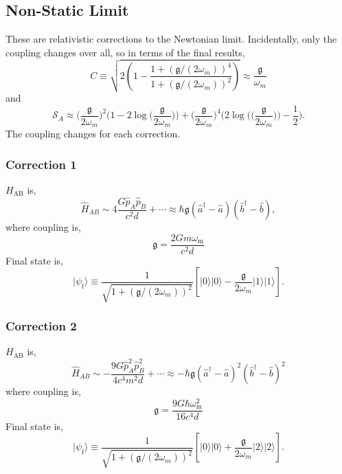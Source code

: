\documentclass[11pt]{article}
\begin{document}
\subsection{Non-Static Limit}
These are relativistic corrections to the Newtonian limit. Incidentally, only the coupling changes over all, so in terms of the final results,
\begin{equation}
C\equiv\sqrt{2(1-\frac{1+(\mathfrak{g}/(2\omega_{m}))^{4}}{1+(\mathfrak{g}/(2\omega_{m}))^{2}})}\approx\frac{\mathfrak{g}}{\omega_{m}}
\end{equation}
and
\begin{equation}
    \mathcal{S}_A \approx \Big(\frac{\mathfrak{g}}{2\omega_{m}}\Big)^2 \Big(1 - 2\log\Big(\frac{\mathfrak{g}}{2\omega_{m}}\Big)\Big) + \Big(\frac{\mathfrak{g}}{2\omega_{m}}\Big)^4 \Big(2\log\Big(\Big(\frac{\mathfrak{g}}{2\omega_{m}}\Big)\Big) - \frac{1}{2}\Big).
\end{equation}
The coupling changes for each correction.
\subsubsection{Correction 1}
$H_{\text{AB}}$ is,
\begin{equation}
\hat{H}_{AB}\sim4\frac{G\hat{p}_{A}\hat{p}_{B}}{c^{2}d}+\cdots \approx \hbar\mathfrak{g}(\hat{a}^{\dagger}-\hat{a})(\hat{b}^{\dagger}-\hat{b}),
\end{equation}
where coupling is,
\begin{equation}
\mathfrak{g}=\frac{2Gm\omega_{\text{m}}}{c^{2}d}
\end{equation}
Final state is,
\begin{equation}
\vert\psi_{\text{f}}\rangle\equiv\frac{1}{\sqrt{1+(\mathfrak{g}/(2\omega_{m}))^{2}}}[\vert0\rangle\vert0\rangle-\frac{\mathfrak{g}}{2\omega_{m}}\vert1\rangle\vert1\rangle].
\end{equation}

\subsubsection{Correction 2}
$H_{\text{AB}}$ is,
\begin{equation}
\hat{H}_{AB}\sim-\frac{9G\hat{p}_{A}^{2}\hat{p}_{B}^{2}}{4c^{4}m^{2}d}+\cdots\approx-\hbar\mathfrak{g}(\hat{a}^{\dagger}-\hat{a})^{2}(\hat{b}^{\dagger}-\hat{b})^{2}
\end{equation}
where coupling is,
\begin{equation}
\mathfrak{g}=\frac{9G\hbar\omega_{\text{m}}^{2}}{16c^{4}d}
\end{equation}
Final state is,
\begin{equation}
\vert\psi_{\text{f}}\rangle\equiv\frac{1}{\sqrt{1+(\mathfrak{g}/(2\omega_{m}))^{2}}}[\vert0\rangle\vert0\rangle+\frac{\mathfrak{g}}{2\omega_{m}}\vert2\rangle\vert2\rangle].
\end{equation}
\end{document}
